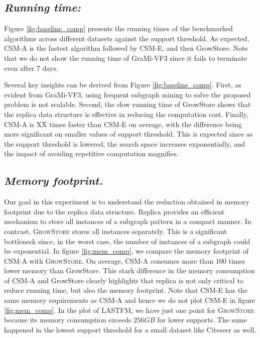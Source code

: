 \subsection{\textit{Running time:}} Figure \ref{fig:baseline_comp} presents the running times of the benchmarked algorithms across different datasets against the support threshold. %
As expected, CSM-A is the fastest algorithm followed by CSM-E, and then GrowStore. Note that we do not show the running time of GraMi-VF3 since it fails to terminate even after $7$ days. 

Several key insights can be derived from Figure \ref{fig:baseline_comp}. First, as evident from GraMi-VF3, using frequent subgraph mining to solve the proposed problem is not scalable. Second, the slow running time of GrowStore shows that the replica data structure is effective in reducing the computation cost. Finally, CSM-A is XX times faster than CSM-E on average, with the difference being more significant on smaller values of support threshold. This is expected since as the support threshold is lowered, the search space increases exponentially, and the impact of avoiding repetitive computation magnifies.

\subsection{\textit{Memory footprint.}} Our goal in this experiment is to understand the reduction obtained in memory footprint due to the replica data structure. Replica provides an efficient mechanism to store all instances of a subgraph pattern in a compact manner. In contrast, \textsc{GrowStore} stores all instances separately. This is a significant bottleneck since, in the worst case, the number of instances of a subgraph could be exponential. %
In figure \ref{fig:mem_comp}, we compare the memory footprint of \textsc{CSM-A} with \textsc{GrowStore}. On average, CSM-A consumes more than $100$ times lower memory than GrowStore. This stark difference in the memory consumption of CSM-A and GrowStore clearly highlights that replica is not only critical to reduce running time, but also the memory footprint. Note that CSM-E has the same memory requirements as CSM-A and hence we do not plot CSM-E in figure \ref{fig:mem_comp}. In the plot of LASTFM, we have just one point for \textsc{GrowStore} because its memory consumption exceeds $256 GB$  for lower supports. The same happened in the lowest support threshold for a small dataset like Citeseer as well. 

